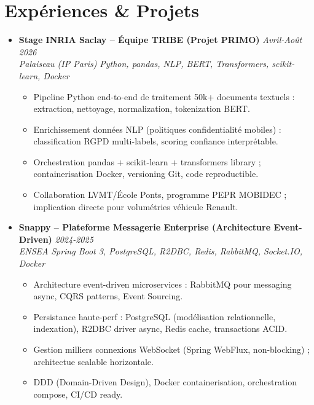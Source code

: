 \documentclass[a4paper,11pt]{article}
\begin{document}
\section{Exp\'eriences \& Projets}
\begin{itemize}[leftmargin=*, label=\tiny$\bullet$, nosep]
    \item \textbf{Stage INRIA Saclay -- \'Equipe TRIBE (Projet PRIMO)} \hfill \textit{Avril-Ao\^ut 2026} \\
    \textit{Palaiseau (IP Paris)} \hfill \textit{Python, pandas, NLP, BERT, Transformers, scikit-learn, Docker}
    \vspace{-2pt}
    \begin{itemize}[leftmargin=0.4cm, nosep, label=\tiny$\bullet$]
        \item \small{Pipeline Python end-to-end de traitement 50k+ documents textuels : extraction, nettoyage, normalization, tokenization BERT.}
        \item \small{Enrichissement donn\'ees NLP (politiques confidentialit\'e mobiles) : classification RGPD multi-labels, scoring confiance interpr\'etable.}
        \item \small{Orchestration pandas + scikit-learn + transformers library ; containerisation Docker, versioning Git, code reproductible.}
        \item \small{Collaboration LVMT/\'Ecole Ponts, programme PEPR MOBIDEC ; implication directe pour volumétries v\'ehicule Renault.}
    \end{itemize}
    \vspace{3pt}

    \item \textbf{Snappy -- Plateforme Messagerie Enterprise (Architecture Event-Driven)} \hfill \textit{2024-2025} \\
    \textit{ENSEA} \hfill \textit{Spring Boot 3, PostgreSQL, R2DBC, Redis, RabbitMQ, Socket.IO, Docker}
    \vspace{-2pt}
    \begin{itemize}[leftmargin=0.4cm, nosep, label=\tiny$\bullet$]
        \item \small{Architecture event-driven microservices : RabbitMQ pour messaging async, CQRS patterns, Event Sourcing.}
        \item \small{Persistance haute-perf : PostgreSQL (mod\'elisation relationnelle, indexation), R2DBC driver async, Redis cache, transactions ACID.}
        \item \small{Gestion milliers connexions WebSocket (Spring WebFlux, non-blocking) ; architectue scalable horizontale.}
        \item \small{DDD (Domain-Driven Design), Docker containerisation, orchestration compose, CI/CD ready.}
    \end{itemize}
    \vspace{3pt}


\end{itemize}
\end{document}
